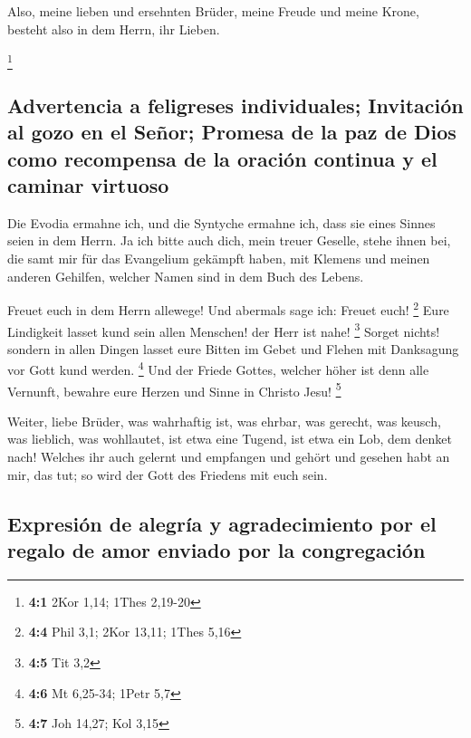  Also, meine lieben und ersehnten Brüder, meine Freude und
meine Krone, besteht also in dem Herrn, ihr Lieben.

\footnote{\textbf{4:1} 2Kor 1,14; 1Thes 2,19-20}

\hypertarget{advertencia-a-feligreses-individuales-invitaciuxf3n-al-gozo-en-el-seuxf1or-promesa-de-la-paz-de-dios-como-recompensa-de-la-oraciuxf3n-continua-y-el-caminar-virtuoso}{%
\subsection{Advertencia a feligreses individuales; Invitación al gozo en
el Señor; Promesa de la paz de Dios como recompensa de la oración
continua y el caminar
virtuoso}\label{advertencia-a-feligreses-individuales-invitaciuxf3n-al-gozo-en-el-seuxf1or-promesa-de-la-paz-de-dios-como-recompensa-de-la-oraciuxf3n-continua-y-el-caminar-virtuoso}}

 Die Evodia ermahne ich, und die Syntyche ermahne ich,
dass sie eines Sinnes seien in dem Herrn.  Ja ich bitte
auch dich, mein treuer Geselle, stehe ihnen bei, die samt mir für das
Evangelium gekämpft haben, mit Klemens und meinen anderen Gehilfen,
welcher Namen sind in dem Buch des Lebens.

 Freuet euch in dem Herrn allewege! Und abermals sage ich:
Freuet euch! \footnote{\textbf{4:4} Phil 3,1; 2Kor 13,11; 1Thes 5,16}
 Eure Lindigkeit lasset kund sein allen Menschen! der Herr
ist nahe! \footnote{\textbf{4:5} Tit 3,2}  Sorget nichts!
sondern in allen Dingen lasset eure Bitten im Gebet und Flehen mit
Danksagung vor Gott kund werden. \footnote{\textbf{4:6} Mt 6,25-34;
  1Petr 5,7}  Und der Friede Gottes, welcher höher ist
denn alle Vernunft, bewahre eure Herzen und Sinne in Christo Jesu!
\footnote{\textbf{4:7} Joh 14,27; Kol 3,15}

 Weiter, liebe Brüder, was wahrhaftig ist, was ehrbar, was
gerecht, was keusch, was lieblich, was wohllautet, ist etwa eine Tugend,
ist etwa ein Lob, dem denket nach!  Welches ihr auch
gelernt und empfangen und gehört und gesehen habt an mir, das tut; so
wird der Gott des Friedens mit euch sein.

\hypertarget{expresiuxf3n-de-alegruxeda-y-agradecimiento-por-el-regalo-de-amor-enviado-por-la-congregaciuxf3n}{%
\subsection{Expresión de alegría y agradecimiento por el regalo de amor
enviado por la
congregación}\label{expresiuxf3n-de-alegruxeda-y-agradecimiento-por-el-regalo-de-amor-enviado-por-la-congregaciuxf3n}}

